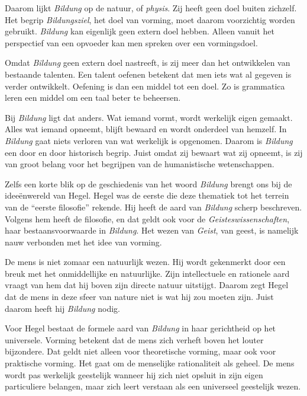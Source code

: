Daarom lijkt \textit{Bildung} op de natuur, of \textit{physis}. Zij heeft geen doel buiten zichzelf. Het begrip \textit{Bildungsziel}, het doel van vorming, moet daarom voorzichtig worden gebruikt. \textit{Bildung} kan eigenlijk geen extern doel hebben. Alleen vanuit het perspectief van een opvoeder kan men spreken over een vormingsdoel.

Omdat \textit{Bildung} geen extern doel nastreeft, is zij meer dan het ontwikkelen van bestaande talenten. Een talent oefenen betekent dat men iets wat al gegeven is verder ontwikkelt. Oefening is dan een middel tot een doel. Zo is grammatica leren een middel om een taal beter te beheersen.

Bij \textit{Bildung} ligt dat anders. Wat iemand vormt, wordt werkelijk eigen gemaakt. Alles wat iemand opneemt, blijft bewaard en wordt onderdeel van hemzelf. In \textit{Bildung} gaat niets verloren van wat werkelijk is opgenomen. Daarom is \textit{Bildung} een door en door historisch begrip. Juist omdat zij bewaart wat zij opneemt, is zij van groot belang voor het begrijpen van de humanistische wetenschappen.

Zelfs een korte blik op de geschiedenis van het woord \textit{Bildung} brengt ons bij de ideeënwereld van Hegel. Hegel was de eerste die deze thematiek tot het terrein van de ``eerste filosofie'' rekende. Hij heeft de aard van \textit{Bildung} scherp beschreven. Volgens hem heeft de filosofie, en dat geldt ook voor de \textit{Geisteswissenschaften}, haar bestaansvoorwaarde in \textit{Bildung}. Het wezen van \textit{Geist}, van geest, is namelijk nauw verbonden met het idee van vorming.

De mens is niet zomaar een natuurlijk wezen. Hij wordt gekenmerkt door een breuk met het onmiddellijke en natuurlijke. Zijn intellectuele en rationele aard vraagt van hem dat hij boven zijn directe natuur uitstijgt. Daarom zegt Hegel dat de mens in deze sfeer van nature niet is wat hij zou moeten zijn. Juist daarom heeft hij \textit{Bildung} nodig.

Voor Hegel bestaat de formele aard van \textit{Bildung} in haar gerichtheid op het universele. Vorming betekent dat de mens zich verheft boven het louter bijzondere. Dat geldt niet alleen voor theoretische vorming, maar ook voor praktische vorming. Het gaat om de menselijke rationaliteit als geheel. De mens wordt pas werkelijk geestelijk wanneer hij zich niet opsluit in zijn eigen particuliere belangen, maar zich leert verstaan als een universeel geestelijk wezen.


